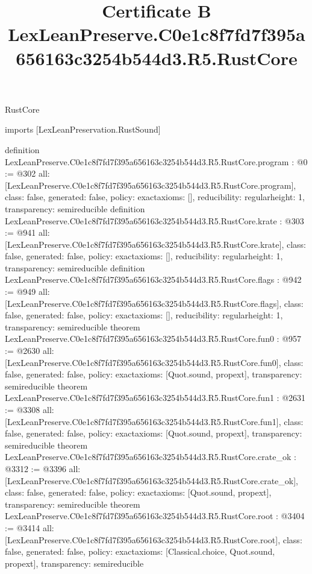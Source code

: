 \begin{lexlean}{RustCore}
\title{Certificate B LexLeanPreserve.C0e1c8f7fd7f395a656163c3254b544d3.R5.RustCore}
\begin{coremodule}
imports [LexLeanPreservation.RustSound]

definition LexLeanPreserve.C0e1c8f7fd7f395a656163c3254b544d3.R5.RustCore.program : @0 := @302 {
  all: [LexLeanPreserve.C0e1c8f7fd7f395a656163c3254b544d3.R5.RustCore.program],
  class: false,
  generated: false,
  policy: exact{axioms: []},
  reducibility: regular{height: 1},
  transparency: semireducible
}
definition LexLeanPreserve.C0e1c8f7fd7f395a656163c3254b544d3.R5.RustCore.krate : @303 := @941 {
  all: [LexLeanPreserve.C0e1c8f7fd7f395a656163c3254b544d3.R5.RustCore.krate],
  class: false,
  generated: false,
  policy: exact{axioms: []},
  reducibility: regular{height: 1},
  transparency: semireducible
}
definition LexLeanPreserve.C0e1c8f7fd7f395a656163c3254b544d3.R5.RustCore.flags : @942 := @949 {
  all: [LexLeanPreserve.C0e1c8f7fd7f395a656163c3254b544d3.R5.RustCore.flags],
  class: false,
  generated: false,
  policy: exact{axioms: []},
  reducibility: regular{height: 1},
  transparency: semireducible
}
theorem LexLeanPreserve.C0e1c8f7fd7f395a656163c3254b544d3.R5.RustCore.fun0 : @957 := @2630 {
  all: [LexLeanPreserve.C0e1c8f7fd7f395a656163c3254b544d3.R5.RustCore.fun0],
  class: false,
  generated: false,
  policy: exact{axioms: [Quot.sound, propext]},
  transparency: semireducible
}
theorem LexLeanPreserve.C0e1c8f7fd7f395a656163c3254b544d3.R5.RustCore.fun1 : @2631 := @3308 {
  all: [LexLeanPreserve.C0e1c8f7fd7f395a656163c3254b544d3.R5.RustCore.fun1],
  class: false,
  generated: false,
  policy: exact{axioms: [Quot.sound, propext]},
  transparency: semireducible
}
theorem LexLeanPreserve.C0e1c8f7fd7f395a656163c3254b544d3.R5.RustCore.crate_ok : @3312 := @3396 {
  all: [LexLeanPreserve.C0e1c8f7fd7f395a656163c3254b544d3.R5.RustCore.crate_ok],
  class: false,
  generated: false,
  policy: exact{axioms: [Quot.sound, propext]},
  transparency: semireducible
}
theorem LexLeanPreserve.C0e1c8f7fd7f395a656163c3254b544d3.R5.RustCore.root : @3404 := @3414 {
  all: [LexLeanPreserve.C0e1c8f7fd7f395a656163c3254b544d3.R5.RustCore.root],
  class: false,
  generated: false,
  policy: exact{axioms: [Classical.choice, Quot.sound, propext]},
  transparency: semireducible
}


\end{coremodule}
\end{lexlean}
